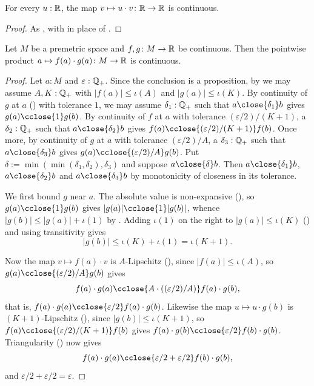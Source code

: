 \begin{corollary}[\agda{[\_]·ᶜ}]
  \label{mulCL}
  For every $u : \mathbb{R}$, the map $v \mapsto u \cdot v \colon \mathbb{R} \to \mathbb{R}$ is continuous.
\end{corollary}
\begin{proof}
  As , with  in place of .
\end{proof}

\begin{lemma}
  \label{mulC}
  Let $M$ be a premetric space and $f, g \colon M \to \mathbb{R}$ be continuous. Then the pointwise product $a \mapsto f(a) \cdot g(a) \colon M \to \mathbb{R}$ is continuous.
\end{lemma}
\begin{proof}
  Let $a : M$ and $\varepsilon : \mathbb{Q}_{+}$. Since the conclusion is a proposition, by  we may assume $A, K : \mathbb{Q}_{+}$ with $\lvert f(a) \rvert \le \iota(A)$ and $\lvert g(a) \rvert \le \iota(K)$. By continuity of $g$ at $a$ () with tolerance $1$, we may assume $\delta_1 : \mathbb{Q}_{+}$ such that $a \close{\delta_1} b$ gives $g(a) \cclose{1} g(b)$. By continuity of $f$ at $a$ with tolerance $(\varepsilon/2)/(K + 1)$, a $\delta_2 : \mathbb{Q}_{+}$ such that $a \close{\delta_2} b$ gives $f(a) \cclose{(\varepsilon/2)/(K + 1)} f(b)$. Once more, by continuity of $g$ at $a$ with tolerance $(\varepsilon/2)/A$, a $\delta_3 : \mathbb{Q}_{+}$ such that $a \close{\delta_3} b$ gives $g(a) \cclose{(\varepsilon/2)/A} g(b)$. Put $\delta := \min(\min(\delta_1, \delta_2), \delta_3)$ and suppose $a \close{\delta} b$. Then $a \close{\delta_1} b$, $a \close{\delta_2} b$ and $a \close{\delta_3} b$ by monotonicity of closeness in its tolerance.

  We first bound $g$ near $a$. The absolute value is non-expansive (), so $g(a) \cclose{1} g(b)$ gives $\lvert g(a) \rvert \cclose{1} \lvert g(b) \rvert$, whence $\lvert g(b) \rvert \le \lvert g(a) \rvert + \iota(1)$ by . Adding $\iota(1)$ on the right to $\lvert g(a) \rvert \le \iota(K)$ () and using transitivity gives
  \[
    \lvert g(b) \rvert \le \iota(K) + \iota(1) = \iota(K + 1).
  \]

  Now the map $v \mapsto f(a) \cdot v$ is $A$-Lipschitz (), since $\lvert f(a) \rvert \le \iota(A)$, so $g(a) \cclose{(\varepsilon/2)/A} g(b)$ gives
  \[
    f(a) \cdot g(a) \cclose{A \cdot ((\varepsilon/2)/A)} f(a) \cdot g(b),
  \]
  that is, $f(a) \cdot g(a) \cclose{\varepsilon/2} f(a) \cdot g(b)$. Likewise the map $u \mapsto u \cdot g(b)$ is $(K + 1)$-Lipschitz (), since $\lvert g(b) \rvert \le \iota(K + 1)$, so $f(a) \cclose{(\varepsilon/2)/(K + 1)} f(b)$ gives $f(a) \cdot g(b) \cclose{\varepsilon/2} f(b) \cdot g(b)$. Triangularity () now gives
  \[
    f(a) \cdot g(a) \cclose{\varepsilon/2 + \varepsilon/2} f(b) \cdot g(b),
  \]
  and $\varepsilon/2 + \varepsilon/2 = \varepsilon$.
\end{proof}


